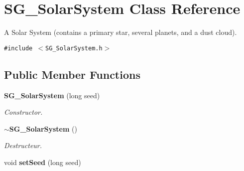 \section{SG\_\-Solar\-System Class Reference}
\label{class_s_g___solar_system}
A Solar System (contains a primary star, several planets, and a dust cloud).  


{\tt \#include $<$SG\_\-Solar\-System.h$>$}

\subsection*{Public Member Functions}
\begin{CompactItemize}
\item 
{\bf SG\_\-Solar\-System} (long seed)\label{class_s_g___solar_system_a0}

\begin{CompactList}\small\item\em Constructor. \item\end{CompactList}\item 
{\bf $\sim$SG\_\-Solar\-System} ()\label{class_s_g___solar_system_a1}

\begin{CompactList}\small\item\em Destructeur. \item\end{CompactList}\item 
void {\bf set\-Seed} (long seed)\label{class_s_g___solar_system_a2}


\end{CompactItemize}
